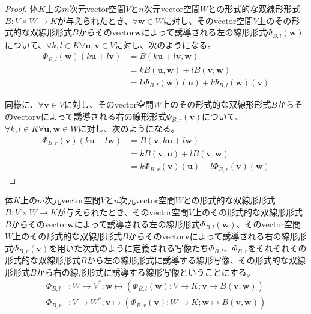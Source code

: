 \documentclass[dvipdfmx]{jsarticle}
\begin{document}
\begin{proof}
体$K$上の$m$次元vector空間$V$と$n$次元vector空間$W$との形式的な双線形形式$B:V \times W \rightarrow K$が与えられたとき、$\forall\mathbf{w} \in W$に対し、そのvector空間$V$上のその形式的な双線形形式$B$からそのvector$\mathbf{w}$によって誘導される左の線形形式$\varPhi_{B,l}\left( \mathbf{w} \right)$について、$\forall k,l \in K\forall\mathbf{u},\mathbf{v} \in V$に対し、次のようになる。
\begin{align*}
\varPhi_{B,l}\left( \mathbf{w} \right)\left( k\mathbf{u} + l\mathbf{v} \right) &= B\left( k\mathbf{u} + l\mathbf{v},\mathbf{w} \right)\\
&= kB\left( \mathbf{u},\mathbf{w} \right) + lB\left( \mathbf{v},\mathbf{w} \right)\\
&= k\varPhi_{B,l}\left( \mathbf{w} \right)\left( \mathbf{u} \right) + l\varPhi_{B,l}\left( \mathbf{w} \right)\left( \mathbf{v} \right)
\end{align*}\par
同様に、$\forall\mathbf{v} \in V$に対し、そのvector空間$W$上のその形式的な双線形形式$B$からそのvector$\mathbf{v}$によって誘導される右の線形形式$\varPhi_{B,r}\left( \mathbf{v} \right)$について、$\forall k,l \in K\forall\mathbf{u},\mathbf{w} \in W$に対し、次のようになる。
\begin{align*}
\varPhi_{B,r}\left( \mathbf{v} \right)\left( k\mathbf{u} + l\mathbf{w} \right) &= B\left( \mathbf{v},k\mathbf{u} + l\mathbf{w} \right)\\
&= kB\left( \mathbf{v},\mathbf{u} \right) + lB\left( \mathbf{v},\mathbf{w} \right)\\
&= k\varPhi_{B,r}\left( \mathbf{v} \right)\left( \mathbf{u} \right) + l\varPhi_{B,r}\left( \mathbf{v} \right)\left( \mathbf{w} \right)
\end{align*}
\end{proof}
\begin{dfn}
体$K$上の$m$次元vector空間$V$と$n$次元vector空間$W$との形式的な双線形形式$B:V \times W \rightarrow K$が与えられたとき、そのvector空間$V$上のその形式的な双線形形式$B$からそのvector$\mathbf{w}$によって誘導される左の線形形式$\varPhi_{B,l}\left( \mathbf{w} \right)$、そのvector空間$W$上のその形式的な双線形形式$B$からそのvector$\mathbf{v}$によって誘導される右の線形形式$\varPhi_{B,r}\left( \mathbf{v} \right)$を用いた次式のように定義される写像たち$\varPhi_{B,l}$、$\varPhi_{B,r}$をそれぞれその形式的な双線形形式$B$から左の線形形式に誘導する線形写像、その形式的な双線形形式$B$から右の線形形式に誘導する線形写像ということにする。
\begin{align*}
\varPhi_{B,l}&:W \rightarrow V^{*};\mathbf{w} \mapsto \left( \varPhi_{B,l}\left( \mathbf{w} \right):V \rightarrow K;\mathbf{v} \mapsto B\left( \mathbf{v},\mathbf{w} \right) \right)\\
\varPhi_{B,r}&:V \rightarrow W^{*};\mathbf{v} \mapsto \left( \varPhi_{B,r}\left( \mathbf{v} \right):W \rightarrow K;\mathbf{w} \mapsto B\left( \mathbf{v},\mathbf{w} \right) \right)
\end{align*}
\end{dfn}
\end{document}
